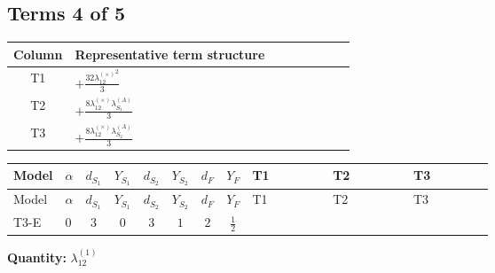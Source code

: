 \documentclass[8pt]{article}
\begin{document}
\begin{landscape}
\subsection*{Terms 4 of 5}
\begin{center}
\begin{tabular}{@{}c >{\raggedright\arraybackslash}p{0.82\linewidth}@{}}
\toprule
Column & Representative term structure \\
\midrule
T1 & \(\displaystyle +\frac{32 {\lambda_{12}^{(\times)}}^2}{3}\) \\
\midrule
T2 & \(\displaystyle +\frac{8 {\lambda_{12}^{(\times)}} {\lambda_{S_1}^{(A)}}}{3}\) \\
\midrule
T3 & \(\displaystyle +\frac{8 {\lambda_{12}^{(\times)}} {\lambda_{S_2}^{(A)}}}{3}\) \\
\midrule
\bottomrule
\end{tabular}
\end{center}
\smallskip
\tiny
\begin{longtable}{@{}llcccccc >{\raggedright\arraybackslash}p{0.21\linewidth} >{\raggedright\arraybackslash}p{0.21\linewidth} >{\raggedright\arraybackslash}p{0.21\linewidth}@{}}
\toprule
Model & $\alpha$ & $d_{S_1}$ & $Y_{S_1}$ & $d_{S_2}$ & $Y_{S_2}$ & $d_F$ & $Y_F$ & T1 & T2 & T3 \\
\midrule
\endfirsthead
\toprule
Model & $\alpha$ & $d_{S_1}$ & $Y_{S_1}$ & $d_{S_2}$ & $Y_{S_2}$ & $d_F$ & $Y_F$ & T1 & T2 & T3 \\
\midrule
\endhead
T3-E & $0$ & $3$ & $0$ & $3$ & $1$ & $2$ & $\frac{1}{2}$ & \scriptsize\adjustbox{max width=\linewidth}{$\begin{gathered} +\frac{32 {\lambda_{12}^{(\times)}}^2}{3}\end{gathered}$} & \scriptsize\adjustbox{max width=\linewidth}{$\begin{gathered} +\frac{8 {\lambda_{12}^{(\times)}} {\lambda_{S_1}^{(A)}}}{3}\end{gathered}$} & \scriptsize\adjustbox{max width=\linewidth}{$\begin{gathered} +\frac{8 {\lambda_{12}^{(\times)}} {\lambda_{S_2}^{(A)}}}{3}\end{gathered}$} \\
\midrule
\bottomrule
\end{longtable}
\clearpage
\noindent\textbf{Quantity: }$\lambda_{12}^{(1)}$\par\smallskip

\end{landscape}
\end{document}
